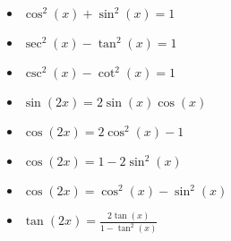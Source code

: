 \documentclass[12pt,a4paper,titlepage]{article}
\begin{document}
            \begin{SummaryBox}[title=Trigonometric identities]
                \begin{SummaryExtensionBox}[title=Pythagorean identities]
                    \begin{multicols}{2}
                        \begin{itemize}[leftmargin=*]
                            \item $\cos^2(x) + \sin^2(x) = 1$
                            \item $\sec^2(x) - \tan^2(x) = 1$
                            \item $\csc^2(x) - \cot^2(x) = 1$
                        \end{itemize}
                    \end{multicols}
                \end{SummaryExtensionBox}
                
                \begin{SummaryExtensionBox}[title=Double-angle identities]
                    \begin{multicols}{2}
                        \begin{itemize}[leftmargin=*]
                            \item $\sin(2x) = 2\sin(x)\cos(x)$
                            \item $\cos(2x) = 2\cos^2(x) - 1$
                            \item $\cos(2x) = 1 - 2\sin^2(x)$
                            \item $\cos(2x) = \cos^2(x) - \sin^2(x)$
                            \item $\tan(2x) = \frac{2\tan(x)}{1-\tan^2(x)}$
                        \end{itemize}
                    \end{multicols}
                \end{SummaryExtensionBox}
                

\end{SummaryBox}
\end{document}
